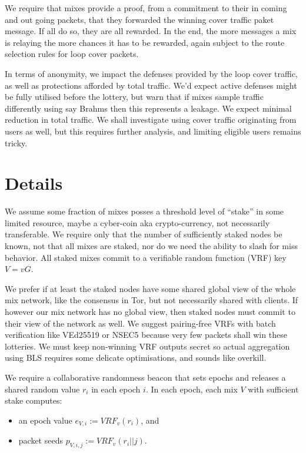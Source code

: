 ﻿\documentclass{sig-alternate-hotpets}
\begin{document}
We require that mixes provide a proof, from a commitment to their in coming and out going packets, that they forwarded the winning cover traffic paket message.  
If all do so, they are all rewarded.  In the end, the more messages a mix is relaying the more chances it has to be rewarded, again subject to the route selection rules for loop cover packets.

In terms of anonymity, we impact the defenses provided by the loop cover traffic, as well as protections afforded by total traffic.  We’d expect active defenses might be fully utilised before the lottery, but warn that if mixes sample traffic differently using say Brahms then this represents a leakage.  We expect minimal reduction in total traffic.  We shall investigate using cover traffic originating from users as well, but this requires further analysis, and limiting eligible users remains tricky.

\section{Details}

We assume some fraction of mixes posses a threshold level of ``stake'' in some limited resource, maybe a cyber-coin aka crypto-currency, not necessarily transferable.  We require only that the number of sufficiently staked nodes be known, not that all mixes are staked, nor do we need the ability to slash for miss behavior.  All staked mixes commit to a verifiable random function (VRF) key $V = v G$.  

We prefer if at least the staked nodes have some shared global view of the whole mix network, like the consensus in Tor, but not necessarily shared with clients.  If however our mix network has no global view, then staked nodes must commit to their view of the network as well.  We suggest pairing-free VRFs with batch verification like VEd25519 or NSEC5 because very few packets shall win these lotteries.  We must keep non-winning VRF outputs secret so actual aggregation using BLS requires some delicate optimisations, and sounds like overkill.

We require a collaborative randomness beacon that sets epochs and releases a shared random value $r_i$ in each epoch $i$.  In each epoch, each mix $V$ with sufficient stake computes:
\begin{itemize}
\item an epoch value $e_{V,i} := VRF_v(r_i)$, and
\item packet seeds $p_{V,i,j} := VRF_v(r_i || j)$.
\end{itemize}
\end{document}
